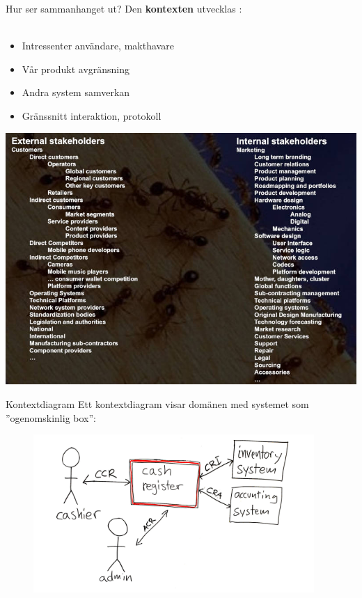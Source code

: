 \documentclass{simpleslides}
\begin{document}
\begin{Slide}{Hur ser sammanhanget ut?}
Den  \textbf{kontexten} utvecklas : \\~
\begin{itemize}
\item Intressenter \hfill användare, makthavare
\item Vår produkt  \hfill avgränsning
\item Andra system \hfill samverkan
\item Gränssnitt \hfill interaktion, protokoll
\end{itemize}
\end{Slide}

{  
\begin{Slide}{\small {}}
  \vspace*{0.2cm}\hspace*{-0.55cm}\includegraphics[width=1.1\textwidth]{img/stakeholders-mobile-domain.jpg}
\end{Slide}
}


\begin{Slide}{Kontextdiagram}
Ett kontextdiagram visar  domänen med systemet som  ''ogenomskinlig box'':
\begin{figure}
\centering\includegraphics[width=0.95\textwidth]{img/context-diagram-cash-register}
\end{figure}
\end{Slide}
\end{document}
